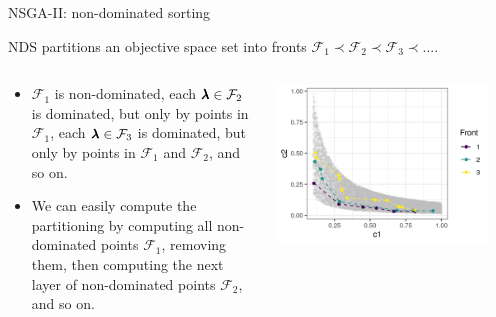 \begin{frame}[allowframebreaks]{NSGA-II: non-dominated sorting}



NDS partitions an objective space set into fronts $\mathcal{F}_1 \prec \mathcal{F}_2 \prec \mathcal{F}_3 \prec ... $.

\begin{columns}
\begin{column}{0.4\textwidth}
\begin{itemize}
    \item $\mathcal{F}_1$ is non-dominated, 
      each $\pmb{\lambda} \in \mathcal{F}_2$ is dominated, but only by points in $\mathcal{F}_1$, 
      each $\pmb{\lambda} \in \mathcal{F}_3$ is dominated, but only by points in $\mathcal{F}_1$ and $\mathcal{F}_2$, 
      and so on. 
    \item We can easily compute the partitioning by computing all non-dominated points  $\mathcal{F}_1$,
        removing them, then computing the next layer of non-dominated points $\mathcal{F}_2$, and so on.
\end{itemize}
\end{column}

\begin{column}{0.6\textwidth}
\begin{center}
\includegraphics[width = 0.9\textwidth]{images/NSGA2_NDS.png}
\end{center}
\end{column}
\end{columns}


\end{frame}
